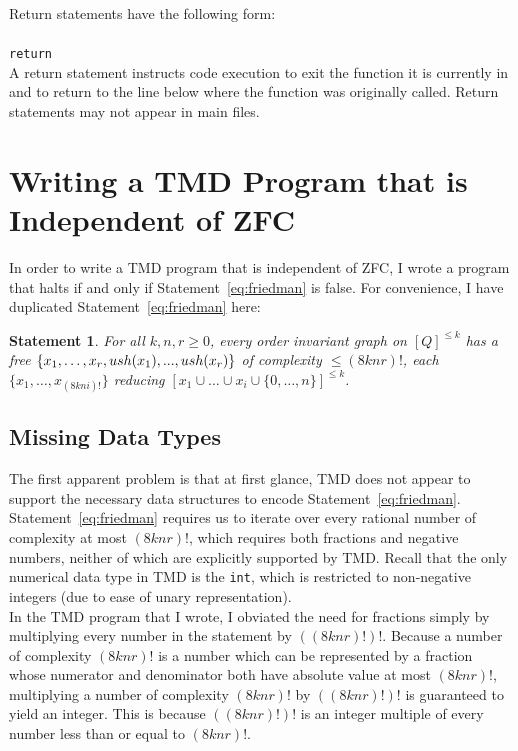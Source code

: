 \documentclass[11pt]{report}
\newtheorem{statement}{Statement}
\begin{document}
Return statements have the following form: \\ \\
\texttt{return} \\

A return statement instructs code execution to exit the function it is currently in and to return to the line below where the function was originally called. Return statements may not appear in main files.

\section{Writing a TMD Program that is Independent of ZFC}

In order to write a TMD program that is independent of ZFC, I wrote a program that halts if and only if Statement~\ref{eq:friedman} is false. For convenience, I have duplicated Statement~\ref{eq:friedman} here: \\

\begin{statement} \label{eq:friedman2}
For all $k, n, r \ge 0$, every order invariant graph on $[Q]^{\le k}$ has a free $\{x_1,\dots,x_r, \\
ush(x_1),...,ush(x_r)\}$ of complexity $\le (8knr)!$, each $\{x_1, \dots, x_{(8kni)!}\}$
reducing $[x_1 \cup \dots \cup x_i \cup \{0,\dots,n\}]^{\le k}$. \cite{friedman}
\end{statement}

\subsection{Missing Data Types}

The first apparent problem is that at first glance, TMD does not appear to support the necessary data structures to encode Statement~\ref{eq:friedman}. Statement~\ref{eq:friedman} requires us to iterate over every rational number of complexity at most $(8knr)!$, which requires both fractions and negative numbers, neither of which are explicitly supported by TMD. Recall that the only numerical data type in TMD is the \texttt{int}, which is restricted to non-negative integers (due to ease of unary representation).\\

In the TMD program that I wrote, I obviated the need for fractions simply by multiplying every number in the statement by $((8knr)!)!$. Because a number of complexity $(8knr)!$ is a number which can be represented by a fraction whose numerator and denominator both have absolute value at most $(8knr)!$, multiplying a number of complexity $(8knr)!$ by $((8knr)!)!$ is guaranteed to yield an integer. This is because $((8knr)!)!$ is an integer multiple of every number less than or equal to $(8knr)!$. \\
\end{document}
